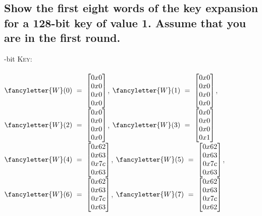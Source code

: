 \documentclass{report}
\begin{document}
		\subsection{Show the first eight words of the key expansion for a 128-bit key of value 1. Assume that you are in the first round.}
		-bit \textsc{Key}:  \\ \\
			$\fancyletter{W}(0) \ = \ \begin{bmatrix} 0x0 \\ 0x0 \\ 0x0 \\ 0x0 \end{bmatrix}$, 
			$\fancyletter{W}(1) \ = \ \begin{bmatrix} 0x0 \\ 0x0 \\ 0x0 \\ 0x0 \end{bmatrix}$, 
			$\fancyletter{W}(2) \ = \ \begin{bmatrix} 0x0 \\ 0x0 \\ 0x0 \\ 0x0 \end{bmatrix}$, 
			$\fancyletter{W}(3) \ = \ \begin{bmatrix} 0x0 \\ 0x0 \\ 0x0 \\ 0x1 \end{bmatrix}$ \\
			$\fancyletter{W}(4) \ = \ \begin{bmatrix} 0x62 \\ 0x63 \\ 0x7c \\ 0x63 \end{bmatrix}$, 
			$\fancyletter{W}(5) \ = \ \begin{bmatrix} 0x62 \\ 0x63 \\ 0x7c \\ 0x63 \end{bmatrix}$, 
			$\fancyletter{W}(6) \ = \ \begin{bmatrix} 0x62 \\ 0x63 \\ 0x7c \\ 0x63 \end{bmatrix}$, 
			$\fancyletter{W}(7) \ = \ \begin{bmatrix} 0x62 \\ 0x63 \\ 0x7c \\ 0x62 \end{bmatrix}$ \\
		\closesection
	\closesection
\end{document}
